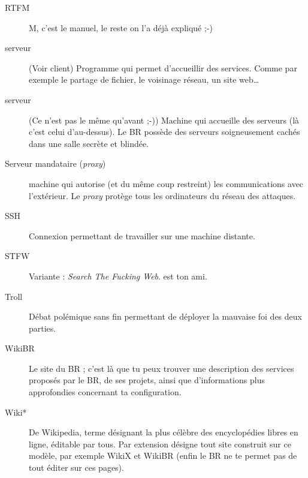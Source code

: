 \begin{description}
  \item[RTFM] M, c'est le manuel, le reste on l'a déjà expliqué ;-)
  \item[serveur] (Voir client) Programme qui permet d'accueillir des services. Comme par exemple le partage de fichier, le voisinage réseau, un site web\ldots\
  \item[serveur] (Ce n'est pas le même qu'avant ;-)) Machine qui accueille des serveurs (là c'est celui d'au-dessus). Le BR possède des serveurs soigneusement cachés dans une salle secrète et blindée.
    \item[Serveur mandataire (\emph{proxy})] machine qui autorise (et du même coup restreint) les communications avec l'extérieur. Le \emph{proxy} protège tous les ordinateurs du réseau des attaques.
  \item[SSH] Connexion permettant de travailler sur une machine distante.
  \item[STFW] Variante : \emph{Search The Fucking Web}.  est ton ami.
  \item[Troll] Débat polémique sans fin permettant de déployer la mauvaise foi des deux parties.
  \item[WikiBR] Le site du BR ; c'est là que tu peux trouver une description des services proposés par le BR, de ses projets, ainsi que
  d'informations plus approfondies concernant ta configuration.
  \item[Wiki*] De Wikipedia, terme d\'esignant la plus c\'el\`ebre des encyclop\'edies libres en ligne, \'editable par tous. Par extension d\'esigne tout site construit sur ce mod\`ele, par exemple WikiX et WikiBR (enfin le BR ne te permet pas de tout \'editer sur ces pages).
\end{description}
